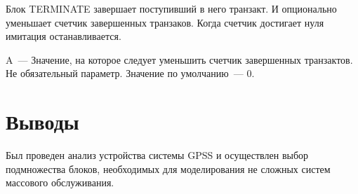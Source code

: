Блок TERMINATE завершает поступивший в него транзакт. И опционально уменьшает счетчик завершенных транзаков. Когда счетчик достигает нуля имитация останавливается.

A~--- Значение, на которое следует уменьшить счетчик завершенных транзактов. Не обязательный параметр. Значение по умолчанию~--- 0.

\section{Выводы}

Был проведен анализ устройства системы GPSS и осуществлен выбор подмножества блоков, необходимых для моделирования не сложных систем массового обслуживания.
